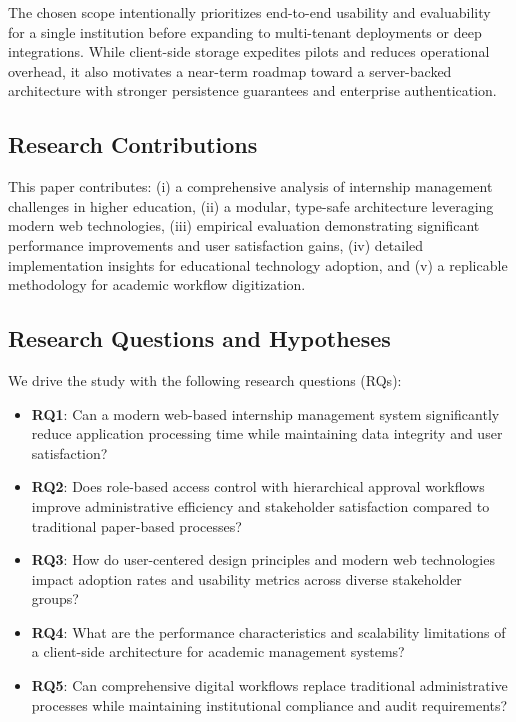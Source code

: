 \documentclass[conference]{IEEEtran}
\begin{document}
The chosen scope intentionally prioritizes end-to-end usability and evaluability for a single institution before expanding to multi-tenant deployments or deep integrations. While client-side storage expedites pilots and reduces operational overhead, it also motivates a near-term roadmap toward a server-backed architecture with stronger persistence guarantees and enterprise authentication.

\subsection{Research Contributions}
This paper contributes: (i) a comprehensive analysis of internship management challenges in higher education, (ii) a modular, type-safe architecture leveraging modern web technologies, (iii) empirical evaluation demonstrating significant performance improvements and user satisfaction gains, (iv) detailed implementation insights for educational technology adoption, and (v) a replicable methodology for academic workflow digitization.

\subsection{Research Questions and Hypotheses}
We drive the study with the following research questions (RQs):

\begin{itemize}[leftmargin=*,nosep]
  \item \textbf{RQ1}: Can a modern web-based internship management system significantly reduce application processing time while maintaining data integrity and user satisfaction?
  \item \textbf{RQ2}: Does role-based access control with hierarchical approval workflows improve administrative efficiency and stakeholder satisfaction compared to traditional paper-based processes?
  \item \textbf{RQ3}: How do user-centered design principles and modern web technologies impact adoption rates and usability metrics across diverse stakeholder groups?
  \item \textbf{RQ4}: What are the performance characteristics and scalability limitations of a client-side architecture for academic management systems?
  \item \textbf{RQ5}: Can comprehensive digital workflows replace traditional administrative processes while maintaining institutional compliance and audit requirements?
\end{itemize}
\end{document}
